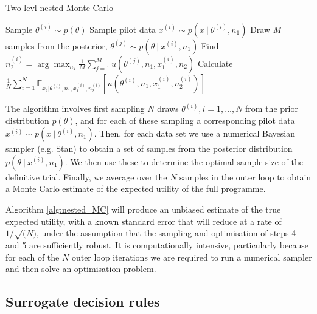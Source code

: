 \documentclass[sagev, Crown]{sagej} %
\begin{document}
\begin{algorithm}
\caption{Two-levl nested Monte Carlo}\label{alg:nested_MC}
\begin{algorithmic}[1]
\State Sample $\theta^{(i)} \sim p(\theta)$
\State Sample pilot data $x^{(i)} \sim p(x ~|~ \theta^{(i)}, n_1)$
\State Draw $M$ samples from the posterior, $\theta^{(j)} \sim p(\theta ~|~ x^{(i)}, n_1)$
\State Find  $n_2^{(i)} = \arg\max_{n_2} \frac{1}{M} \sum_{j=1}^{M} u(\theta^{(j)}, n_1, x_1^{(i)}, n_2)$
\EndFor 
\State Calculate $\frac{1}{N} \sum_{i=1}^{N} \mathbb{E}_{x_2 | \theta^{(i)}, n_1, x_1^{(i)}, n_2^{(i)}}[ u(\theta^{(i)}, n_1, x_1^{(i)}, n_2^{(i)}) ]$
\end{algorithmic}
\end{algorithm}

The algorithm involves first sampling $N$ draws $\theta^{(i)}, i=1,\ldots,N$ from the prior distribution $p(\theta)$, and for each of these sampling a corresponding pilot data $x^{(i)} \sim p(x ~|~ \theta^{(i)}, n_1)$. Then, for each data set we use a numerical Bayesian sampler (e.g. Stan) to obtain a set of samples from the posterior distribution $p(\theta ~|~ x^{(i)}, n_1)$. We then use these to determine the optimal sample size of the definitive trial. Finally, we average over the $N$ samples in the outer loop to obtain a Monte Carlo estimate of the expected utility of the full programme.

Algorithm \ref{alg:nested_MC} will produce an unbiased estimate of the true expected utility, with a known standard error that will reduce at a rate of $1/\sqrt(N)$, under the assumption that the sampling and optimisation of steps 4 and 5 are sufficiently robust. It is computationally intensive,  particularly because for each of the $N$ outer loop iterations we are required to run a numerical sampler and then solve an optimisation problem.

\subsection{Surrogate decision rules}
\end{document}

